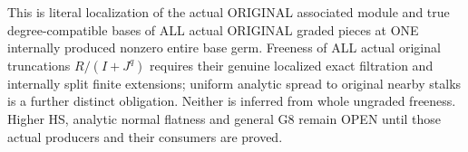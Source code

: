 \begin{remark}
This is literal localization of the actual ORIGINAL associated module and
true degree-compatible bases of ALL actual ORIGINAL graded pieces at ONE
internally produced nonzero entire base germ. Freeness of ALL actual original
truncations $R/(I+J^q)$ requires their genuine localized exact filtration and
internally split finite extensions; uniform analytic spread to original
nearby stalks is a further distinct obligation. Neither is inferred from
whole ungraded freeness. Higher HS, analytic normal flatness and general G8
remain OPEN until those actual producers and their consumers are proved.
\end{remark}
